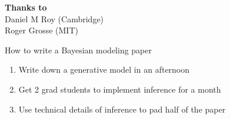 \small

\renewcommand{\inserttotalframenumber}{11}



\begin{frame}
  \begin{block}{}
    \titlepage
  \end{block}
  \begin{center}
    {\bf Thanks to}\\
    Daniel M Roy (Cambridge)\\
    Roger Grosse (MIT)
  \end{center}
\end{frame}

\begin{frame}{How to write a Bayesian modeling paper}
  \begin{block}{}
    \begin{enumerate}
      \item Write down a generative model in an afternoon
      \vspace{\baselineskip}
      \vspace{\baselineskip}
      \item Get 2 grad students to implement inference for a month
      \vspace{\baselineskip}
      \vspace{\baselineskip}
      \item Use technical details of inference to pad half of the paper
    \end{enumerate}
  \end{block}
\end{frame}

